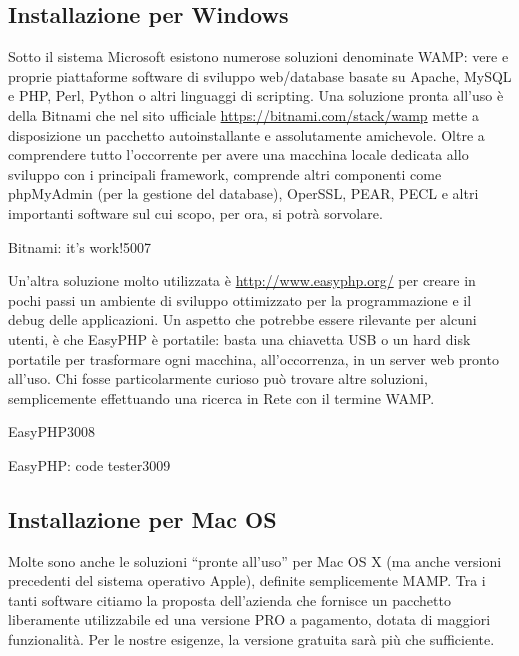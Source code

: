 \label{sec:installazione}
\subsection{Installazione per Windows}
Sotto il sistema Microsoft esistono numerose soluzioni denominate \ac{WAMP}: vere e proprie piattaforme software di sviluppo web/database basate su Apache, MySQL e PHP, Perl, Python o altri linguaggi di scripting. Una soluzione pronta all'uso è  della Bitnami che nel sito ufficiale \url{https://bitnami.com/stack/wamp} mette a disposizione un pacchetto autoinstallante e assolutamente amichevole. Oltre a comprendere tutto l'occorrente per avere una macchina locale dedicata allo sviluppo con i principali framework, comprende altri componenti come phpMyAdmin (per la gestione del database), OperSSL, PEAR, PECL e altri importanti software sul cui scopo, per ora, si potrà sorvolare. 

\begin{img}{Bitnami: it's work!}{5}{007}
\end{img}

Un'altra soluzione molto utilizzata è  \url{http://www.easyphp.org/} per creare in pochi passi un ambiente di sviluppo ottimizzato per la programmazione e il debug delle applicazioni. Un aspetto che potrebbe essere rilevante per alcuni utenti, è che EasyPHP è portatile: basta una chiavetta USB o un hard disk portatile per trasformare ogni macchina, all'occorrenza, in un server web pronto all'uso. Chi fosse particolarmente curioso può trovare altre soluzioni, semplicemente effettuando una ricerca in Rete con il termine \ac{WAMP}.

\begin{img}{EasyPHP}{3}{008}
\end{img}

\begin{img}{EasyPHP: code tester}{3}{009}
\end{img}

\subsection{Installazione per Mac OS}
Molte sono anche le soluzioni ``pronte all'uso'' per Mac OS X (ma anche versioni precedenti del sistema operativo Apple), definite semplicemente \ac{MAMP}. Tra i tanti software citiamo la proposta dell'azienda  che fornisce un pacchetto liberamente utilizzabile ed una versione PRO a pagamento, dotata di maggiori funzionalità. Per le nostre esigenze, la versione gratuita sarà più che sufficiente.

